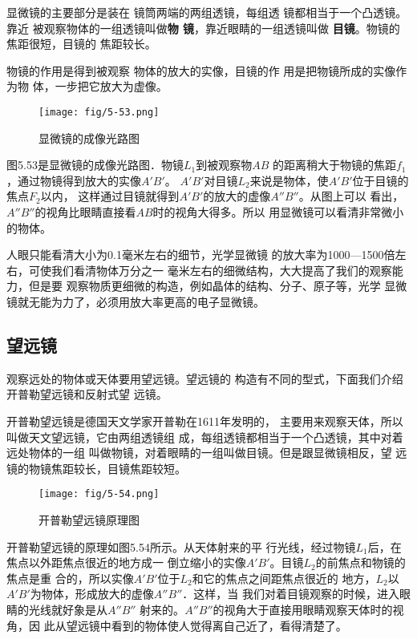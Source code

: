 显微镜的主要部分是装在
镜筒两端的两组透镜，每组透
镜都相当于一个凸透镜。靠近
被观察物体的一组透镜叫做\textbf{物
镜}，靠近眼睛的一组透镜叫做
\textbf{目镜}。物镜的焦距很短，目镜的
焦距较长。

物镜的作用是得到被观察
物体的放大的实像，目镜的作
用是把物镜所成的实像作为物
体，一步把它放大为虚像。

\begin{figure}[htp]\centering
    \texttt{[image: fig/5-53.png]}
    \caption{显微镜的成像光路图}
    \end{figure}

图5.53是显微镜的成像光路图．物镜$L_1$到被观察物$AB$
的距离稍大于物镜的焦距$f_1$，通过物镜得到放大的实像$A'B'$。
$A'B'$对目镜$L_2$来说是物体，使$A'B'$位于目镜的焦点$F_2$以内，
这样通过目镜就得到$A'B'$的放大的虚像$A''B''$。从图上可以
看出，$A''B''$的视角比眼睛直接看$AB$时的视角大得多。所以
用显微镜可以看清非常微小的物体。

人眼只能看清大小为0.1毫米左右的细节，光学显微镜
的放大率为1000—1500倍左右，可使我们看清物体万分之一
毫米左右的细微结构，大大提高了我们的观察能力，但是要
观察物质更细微的构造，例如晶体的结构、分子、原子等，光学
显微镜就无能为力了，必须用放大率更高的电子显微镜。

\subsection{望远镜}

观察远处的物体或天体要用望远镜。望远镜的
构造有不同的型式，下面我们介绍开普勒望远镜和反射式望
远镜。

开普勒望远镜是德国天文学家开普勒在1611年发明的，
主要用来观察天体，所以叫做天文望远镜，它由两组透镜组
成，每组透镜都相当于一个凸透镜，其中对着远处物体的一组
叫做物镜，对着眼睛的一组叫做目镜。但是跟显微镜相反，望
远镜的物镜焦距较长，目镜焦距较短。
\begin{figure}[htp]\centering
    \texttt{[image: fig/5-54.png]}
    \caption{开普勒望远镜原理图}
    \end{figure}

开普勒望远镜的原理如图5.54所示。从天体射来的平
行光线，经过物镜$L_1$后，在焦点以外距焦点很近的地方成一
倒立缩小的实像$A'B'$。目镜$L_2$的前焦点和物镜的焦点是重
合的，所以实像$A'B'$位于$L_2$和它的焦点之间距焦点很近的
地方，$L_2$以$A'B'$为物体，形成放大的虚像$A''B''$．这样，当
我们对着目镜观察的时候，进入眼睛的光线就好象是从$A''B''$
射来的。$A''B''$的视角大于直接用眼睛观察天体时的视角，因
此从望远镜中看到的物体使人觉得离自己近了，看得清楚了。

